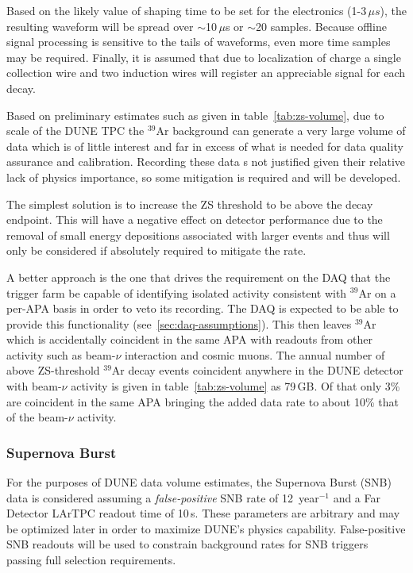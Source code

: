 Based on the likely value of shaping time to be set for the electronics (1-3\,${\mu}s$),
the resulting waveform will be spread over $\sim$10\,$\mu$s or $\sim$20 samples. Because offline signal
processing is sensitive to the tails of waveforms, even more time samples may be required.
Finally, it is assumed that due to localization of charge a single collection wire and two induction
wires will register an appreciable signal for each decay.

Based on preliminary estimates such as given in table~\ref{tab:zs-volume},
due to scale of the DUNE TPC the $^{39}$Ar background can generate a very large volume
of data which is of little interest and far in excess of what is needed for data quality assurance and
calibration. Recording these data s not justified given their relative lack
of physics importance, so some mitigation is required and will be developed.

The simplest solution
is to increase the ZS threshold to be above the decay endpoint.
This will have a negative effect on detector performance due to the removal of small energy
depositions associated with larger events and thus will only be
considered if absolutely required to mitigate the rate.

A better approach is the one that drives the requirement on the DAQ
that the trigger farm be capable of identifying isolated activity
consistent with $^{39}$Ar on a per-APA basis in order to veto its
recording. The DAQ is expected to be able to provide this functionality
(see~\ref{sec:daq-assumptions}).
This then leaves $^{39}$Ar which is accidentally coincident in the
same APA with readouts from other activity such as beam-$\nu$
interaction and cosmic muons.
The annual number of above ZS-threshold $^{39}$Ar decay events
coincident anywhere in the DUNE detector with beam-$\nu$ activity is
given in table~\ref{tab:zs-volume} as 79\,GB. Of that only 3\% are coincident
in the same APA bringing the added data rate to about 10\% that of the beam-$\nu$ activity.

\subsubsection{Supernova Burst}
\label{sec:snb-data}
For the purposes of DUNE data volume estimates, the Supernova Burst (SNB)
data is considered assuming a
\textit{false-positive} SNB rate of 12~year$^{-1}$ and a Far Detector LArTPC
readout time of 10\,s.  These parameters are arbitrary and may be optimized later in order
to maximize DUNE's physics capability.  False-positive SNB readouts will be used to constrain
background rates for SNB triggers passing full selection requirements.

